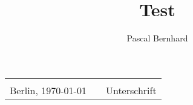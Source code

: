 \documentclass[]{scrreprt}
\title{Test}
\author{Pascal Bernhard}
\begin{document}
\maketitle

\begin{abstract}
\end{abstract}

\begin{tabular}{lp{2em}l}
 \hspace{5cm}   && \hspace{4cm} \\\cline{1-1}\cline{3-3}
 Berlin, \today     && Unterschrift
\end{tabular}
\end{document}
